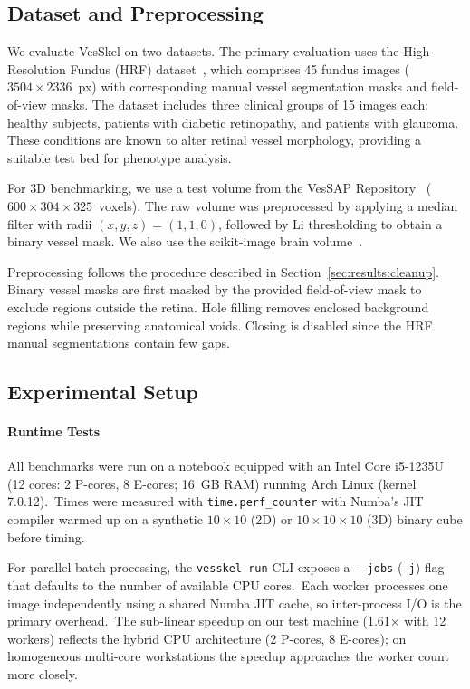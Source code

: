 \documentclass[11pt]{article}
\begin{document}
\subsection{Dataset and Preprocessing}\label{sec:methods:data}

We evaluate VesSkel on two datasets. The primary evaluation uses the
High-Resolution Fundus (HRF) dataset~\cite{HRF}, which comprises 45
fundus images ($3504 \times 2336$~px) with corresponding manual
vessel segmentation masks and field-of-view masks. The dataset
includes three clinical groups of 15 images each: healthy subjects,
patients with diabetic retinopathy, and patients with glaucoma. These
conditions are known to alter retinal vessel morphology, providing a
suitable test bed for phenotype analysis.

For 3D benchmarking, we use a test volume from the VesSAP
Repository~\cite{VesSAP} ($600\times304\times325$~voxels). The raw
volume was preprocessed by applying a median filter with radii $(x,
y, z) = (1, 1, 0)$, followed by Li thresholding to obtain a binary
vessel mask. We also use the scikit-image brain volume~\cite{skimage}.

Preprocessing follows the procedure described in
Section~\ref{sec:results:cleanup}. Binary vessel masks are first
masked by the provided field-of-view mask to exclude regions outside
the retina. Hole filling removes enclosed background regions while
preserving anatomical voids. Closing is disabled since the HRF manual
segmentations contain few gaps.

\subsection{Experimental Setup}\label{sec:methods:setup}

\paragraph{Runtime Tests}\label{sec:methods:setup:runtime}

All benchmarks were run on a notebook equipped with an Intel Core
i5-1235U (12 cores: 2 P-cores, 8 E-cores; 16~GB RAM) running Arch
Linux (kernel 7.0.12).~Times were measured with
\texttt{time.perf\_counter} with Numba's JIT compiler warmed up on a
synthetic $10\times10$ (2D) or $10\times10\times10$ (3D) binary cube
before timing.

For parallel batch processing, the \texttt{vesskel run} CLI exposes a
\texttt{-{}-jobs} (\texttt{-j}) flag that defaults to the number of
available CPU cores.~Each worker processes one image independently
using a shared Numba JIT cache, so inter-process I/O is the primary
overhead.~The sub-linear speedup on our test machine (1.61$\times$ with
12 workers) reflects the hybrid CPU architecture (2 P-cores, 8
E-cores); on homogeneous multi-core workstations the speedup approaches
the worker count more closely.
\end{document}
